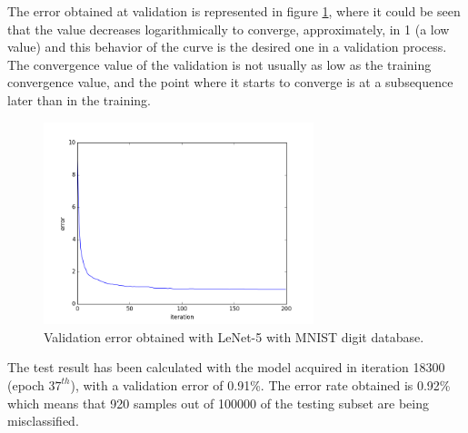 The error obtained at validation is represented in figure \ref{fig:Lenetresult}, where it could be seen that the value decreases logarithmically to converge, approximately, in 1 (a low value) and this behavior of the curve is the desired one in a validation process. The convergence value of the validation is not usually as low as the training convergence value, and the point where it starts to converge is at a subsequence later than in the training.\\

\begin{figure}[htb]
\centering
\includegraphics[width=0.7\textwidth]{images/ModificandoLenet/error_lenet.png}
\caption{Validation error obtained with LeNet-5 with MNIST digit database.} \label{fig:Lenetresult}
\end{figure}

The test result has been calculated with the model acquired in iteration 18300 (epoch $37^{th}$), with a validation error of 0.91\%. The error rate obtained is 0.92\% which means that 920 samples out of 100000 of the testing subset are being misclassified.


